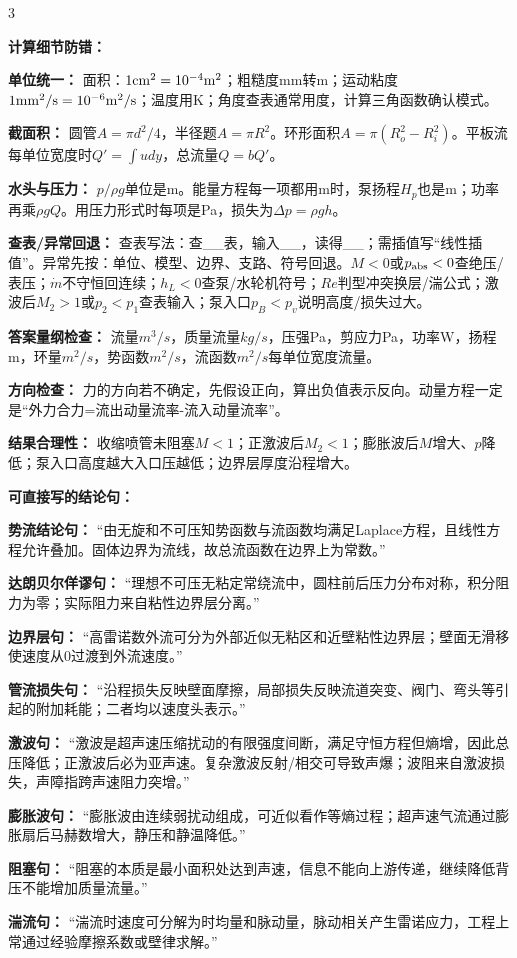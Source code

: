 \documentclass[a4paper]{article}
\newcommand{\sect}[1]{\par{\bfseries\color{Q}#1：}}
\begin{document}
\begin{multicols}{3}
{\sect{计算细节防错}
\sect{单位统一}
面积：$1{\rm cm^2}=10^{-4}{\rm m^2}$；粗糙度mm转m；运动粘度$1{\rm mm^2/s}=10^{-6}{\rm m^2/s}$；温度用K；角度查表通常用度，计算三角函数确认模式。
\sect{截面积}
圆管$A=\pi d^2/4$，半径题$A=\pi R^2$。环形面积$A=\pi(R_o^2-R_i^2)$。平板流每单位宽度时$Q'=\int udy$，总流量$Q=bQ'$。
\sect{水头与压力}
$p/\rho g$单位是m。能量方程每一项都用m时，泵扬程$H_p$也是m；功率再乘$\rho gQ$。用压力形式时每项是Pa，损失为$\Delta p=\rho gh$。
\sect{查表/异常回退}
查表写法：查\_\_表，输入\_\_，读得\_\_；需插值写“线性插值”。异常先按：单位、模型、边界、支路、符号回退。$M<0$或$p_{\rm abs}<0$查绝压/表压；$\dot m$不守恒回连续；$h_L<0$查泵/水轮机符号；$Re$判型冲突换层/湍公式；激波后$M_2>1$或$p_2<p_1$查表输入；泵入口$p_B<p_v$说明高度/损失过大。
\sect{答案量纲检查}
流量$m^3/s$，质量流量$kg/s$，压强Pa，剪应力Pa，功率W，扬程m，环量$m^2/s$，势函数$m^2/s$，流函数$m^2/s$每单位宽度流量。
\sect{方向检查}
力的方向若不确定，先假设正向，算出负值表示反向。动量方程一定是“外力合力=流出动量流率-流入动量流率”。
\sect{结果合理性}
收缩喷管未阻塞$M<1$；正激波后$M_2<1$；膨胀波后$M$增大、$p$降低；泵入口高度越大入口压越低；边界层厚度沿程增大。

\sect{可直接写的结论句}
\sect{势流结论句}
“由无旋和不可压知势函数与流函数均满足Laplace方程，且线性方程允许叠加。固体边界为流线，故总流函数在边界上为常数。”
\sect{达朗贝尔佯谬句}
“理想不可压无粘定常绕流中，圆柱前后压力分布对称，积分阻力为零；实际阻力来自粘性边界层分离。”
\sect{边界层句}
“高雷诺数外流可分为外部近似无粘区和近壁粘性边界层；壁面无滑移使速度从0过渡到外流速度。”
\sect{管流损失句}
“沿程损失反映壁面摩擦，局部损失反映流道突变、阀门、弯头等引起的附加耗能；二者均以速度头表示。”
\sect{激波句}
“激波是超声速压缩扰动的有限强度间断，满足守恒方程但熵增，因此总压降低；正激波后必为亚声速。复杂激波反射/相交可导致声爆；波阻来自激波损失，声障指跨声速阻力突增。”
\sect{膨胀波句}
“膨胀波由连续弱扰动组成，可近似看作等熵过程；超声速气流通过膨胀扇后马赫数增大，静压和静温降低。”
\sect{阻塞句}
“阻塞的本质是最小面积处达到声速，信息不能向上游传递，继续降低背压不能增加质量流量。”
\sect{湍流句}
“湍流时速度可分解为时均量和脉动量，脉动相关产生雷诺应力，工程上常通过经验摩擦系数或壁律求解。”

}
\end{multicols}
\end{document}
